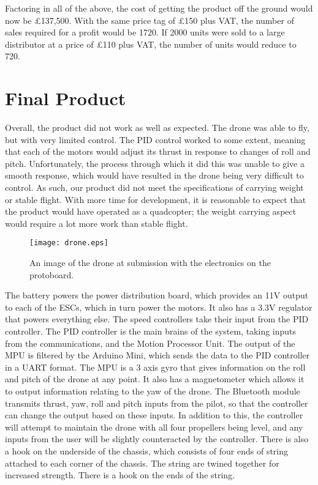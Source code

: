 \documentclass[a4paper]{article}
\begin{document}
Factoring in all of the above, the cost of getting the product off the ground would now be £137,500. With the same price tag of £150 plus VAT, the number of sales required for a profit would be 1720. If 2000 units were sold to a large distributor at a price of £110 plus VAT, the number of units would reduce to 720.


\section{Final Product}

Overall, the product did not work as well as expected. The drone was able to fly, but with very limited control. The PID control worked to some extent, meaning that each of the motors would adjust its thrust in response to changes of roll and pitch. Unfortunately, the process through which it did this was unable to give a smooth response, which would have resulted in the drone being very difficult to control. As such, our product did not meet the specifications of carrying weight or stable flight. With more time for development, it is reasonable to expect that the product would have operated as a quadcopter; the weight carrying aspect would require a lot more work than stable flight.

\begin{figure}[H]
  \centering
  \texttt{[image: drone.eps]}
  \caption{An image of the drone at submission with the electronics on the protoboard.}
\end{figure}

The battery powers the power distribution board, which provides an 11V output to each of the ESCs, which in turn power the motors. It also has a 3.3V regulator that powers everything else. The speed controllers take their input from the PID controller. The PID controller is the main brains of the system, taking inputs from the communications, and the Motion Processor Unit. The output of the MPU is filtered by the Arduino Mini, which sends the data to the PID controller in a UART format. The MPU is a 3 axis gyro that gives information on the roll and pitch of the drone at any point. It also has a magnetometer which allows it to output information relating to the yaw of the drone. The Bluetooth module transmits thrust, yaw, roll and pitch inputs from the pilot, so that the controller can change the output based on these inputs. In addition to this, the controller will attempt to maintain the drone with all four propellers being level, and any inputs from the user will be slightly counteracted by the controller. There is also a hook on the underside of the chassis, which consists of four ends of string attached to each corner of the chassis. The string are twined together for increased strength. There is a hook on the ends of the string.
\end{document}
